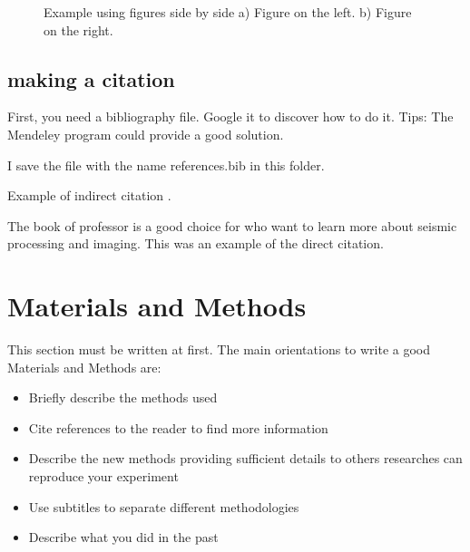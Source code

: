 \documentclass[twoside,letterpaper,twocolumn]{article}
\begin{document}
\begin{figure}[h!]
	\centering
	\caption{Example using figures side by side a) Figure on the left. b) Figure on the right. }
	\label{fig:label3}
\end{figure}


\subsection{making a citation}

First, you need a bibliography file. Google it to discover how to do it. Tips: The Mendeley program could provide a good solution.

I save the file with the name references.bib in this folder.

Example of indirect citation \citep{Yilmaz2000}.

The book of professor \cite{Claerbout1984} is a good choice for who want to learn more about seismic processing and imaging. This was an example of the direct citation.



\section{Materials and Methods}

This section must be written at first. The main orientations to write a good Materials and Methods are:

\begin{itemize}
	\item Briefly describe the methods used
	\item Cite references to the reader to find more information
	\item Describe the new methods providing sufficient details to others researches can reproduce your experiment
	\item Use subtitles to separate different methodologies
	\item Describe what you did in the past
\end{itemize}
\end{document}
